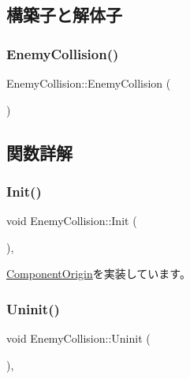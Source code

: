 \subsection{構築子と解体子}
\mbox{\label{class_enemy_collision_ae81d47621dafebb16bc7c6a68388dacd}} 
\subsubsection{\texorpdfstring{Enemy\+Collision()}{EnemyCollision()}}
{\footnotesize\ttfamily Enemy\+Collision\+::\+Enemy\+Collision (\begin{DoxyParamCaption}{ }\end{DoxyParamCaption})}



\subsection{関数詳解}
\mbox{\label{class_enemy_collision_ae5c000a30c8c4a023dd0c8e658def772}} 
\subsubsection{\texorpdfstring{Init()}{Init()}}
{\footnotesize\ttfamily void Enemy\+Collision\+::\+Init (\begin{DoxyParamCaption}{ }\end{DoxyParamCaption})\hspace{0.3cm}{\ttfamily [override]}, {\ttfamily [virtual]}}



\mbox{\hyperlink{class_component_origin_a9f674891257f2272b1636d8b6bb05d81}{Component\+Origin}}を実装しています。

\mbox{\label{class_enemy_collision_a2a194c606fd162db803c70c6fed9b9e4}} 
\subsubsection{\texorpdfstring{Uninit()}{Uninit()}}
{\footnotesize\ttfamily void Enemy\+Collision\+::\+Uninit (\begin{DoxyParamCaption}{ }\end{DoxyParamCaption})\hspace{0.3cm}{\ttfamily [override]}, {\ttfamily [virtual]}}




